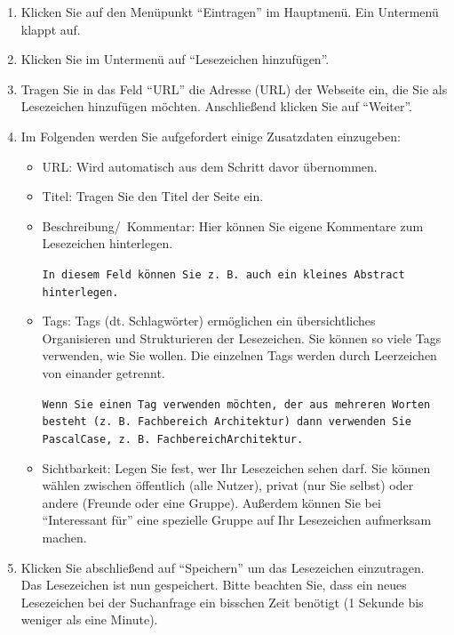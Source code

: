 \begin{enumerate}
    \item Klicken Sie auf den Menüpunkt \enquote{Eintragen} im Hauptmenü. Ein Untermenü klappt auf.
    \item Klicken Sie im Untermenü auf \enquote{Lesezeichen hinzufügen}.
    \item Tragen Sie in das Feld \enquote{URL} die Adresse (URL) der Webseite ein, die Sie als Lesezeichen hinzufügen möchten. Anschließend klicken Sie auf \enquote{Weiter}. 
    \item Im Folgenden werden Sie aufgefordert einige Zusatzdaten einzugeben:
    \begin{itemize}
        \item URL: Wird automatisch aus dem Schritt davor übernommen.
        \item Titel: Tragen Sie den Titel der Seite ein. 
        \item Beschreibung/~Kommentar: Hier können Sie eigene Kommentare zum Lesezeichen hinterlegen. 
			\begin{mdframed}[style=tipp]\texttt{In diesem Feld können Sie z. B. auch ein kleines Abstract hinterlegen.} 
			\end{mdframed}
        \item Tags: Tags (dt. Schlagwörter) ermöglichen ein übersichtliches Organisieren und Strukturieren der Lesezeichen. Sie können so viele Tags verwenden, wie Sie wollen. Die einzelnen Tags werden durch Leerzeichen von einander getrennt. \newline 
        	\begin{mdframed}[style=tipp]
	\texttt{Wenn Sie einen Tag verwenden möchten, der aus mehreren Worten besteht (z.~B. Fachbereich Architektur) dann verwenden Sie PascalCase, z.~B. FachbereichArchitektur.} 
			\end{mdframed}
        \item Sichtbarkeit: Legen Sie fest, wer Ihr Lesezeichen sehen darf. Sie können wählen zwischen öffentlich (alle Nutzer), privat (nur Sie selbst) oder andere (Freunde oder eine Gruppe). Außerdem können Sie bei \enquote{Interessant für} eine spezielle Gruppe auf Ihr Lesezeichen aufmerksam machen.  
    \end{itemize}
    \item Klicken Sie abschließend auf \enquote{Speichern} um das Lesezeichen einzutragen. Das Lesezeichen ist nun gespeichert. Bitte beachten Sie, dass ein neues Lesezeichen bei der Suchanfrage ein bisschen Zeit benötigt (1 Sekunde bis weniger als eine Minute). 
\end{enumerate}
